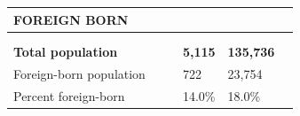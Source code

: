 \documentclass[9pt]{report}
\begin{document}
\newpage
\setlength{\tabcolsep}{.01in} %
\begin{tabular}{p{.10in}p{.10in}p{.10in}p{3.7in}>{\hfill}p{.85in}>{\hfill}p{.85in}>{\hfill}p{.85in}>{\hfill}p{.85in}p{0.1in}}
\multicolumn{9}{l}{\parbox{7.1in}{\raggedright{\large{\strut\textbf{FOREIGN BORN}\strut}}}} \\ 
\hline
\multicolumn{4}{l}{\parbox{3.5in}{\raggedright{\textbf{}}}} & \multicolumn{1}{r}{\parbox{.85in}{\strut\raggedleft{\textbf{}\strut}}} & \multicolumn{1}{r}{\parbox{.85in}{\strut\raggedleft{\textbf{}\strut}}} & \multicolumn{1}{r}{\parbox{.85in}{\strut{}}} & \multicolumn{1}{r}{\parbox{.85in}{\strut{}}} & \\ 
\multicolumn{9}{l}{} \\ 
\multicolumn{4}{l}{\parbox{3.5in}{\strut\raggedright{\textbf{Total population}\strut}}} & \textbf{} & \textbf{} & \textbf{5,115} & \textbf{135,736} & \textbf{} \\ 
\multicolumn{4}{l}{\parbox{3.6in}{\strut\raggedright{{Foreign-born population}}\strut}} &  &  & 722 & 23,754 & \multicolumn{1}{l}{}  \\ 
\multicolumn{4}{l}{\parbox{3.6in}{\strut\raggedright{{Percent foreign-born}}\strut}} &  &  & 14.0\% & 18.0\% & \multicolumn{1}{l}{}  \\ 

\end{tabular}
\setlength{\tabcolsep}{6pt} %
\end{document}
